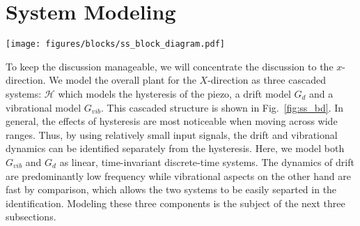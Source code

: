\documentclass[journal,twocolumn,twoside]{IEEEtran}
\begin{document}
\section{System Modeling}
\begin{figure*}
  \centering  
  \texttt{[image: figures/blocks/ss\_block\_diagram.pdf]}
  \caption{The overall plant model consists of a vibrational component, $G_{vib}$, a drift model $G_{d}$ and a hysteresis model $\mathcal{H}[\cdot]$. }
  \label{fig:ss_bd}
\end{figure*}
To keep the discussion manageable, we will concentrate the discussion to the $x$-direction. We model the overall plant for the $X$-direction as three cascaded systems: $\mathcal{H}$ which models the hysteresis of the piezo, a drift model $G_d$ and a vibrational model $G_{vib}$. This cascaded structure is shown in Fig.~\ref{fig:ss_bd}. In general, the effects of hysteresis are most noticeable when moving across wide ranges. Thus, by using relatively small input signals, the drift and vibrational dynamics can be identified separately from the hysteresis. Here, we model both $G_{vib}$ and $G_d$ as linear, time-invariant discrete-time systems. The dynamics of drift are predominantly low frequency while vibrational aspects on the other hand are fast by comparison, which allows the two systems to be easily separted in the identification.
 Modeling these three components is the subject of the next three subsections.

%   
%   
\end{document}
